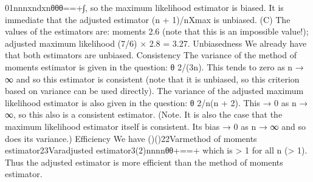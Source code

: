 \documentclass{article}
\begin{document}
\begin{enumerate}[(i)]
01nnnxndxnθθθ==+∫, so the maximum likelihood estimator is biased.
It is immediate that the adjusted estimator {(n + 1)/n}Xmax is unbiased.
(C) The values of the estimators are: moments 2.6 (note that this is an impossible value!); adjusted maximum likelihood (7/6) × 2.8 = 3.27.
Unbiasedness
We already have that both estimators are unbiased.
Consistency
The variance of the method of moments estimator is given in the question: θ 2/(3n). This tends to zero as n → ∞ and so this estimator is consistent (note that it is unbiased, so this criterion based on variance can be used directly).
The variance of the adjusted maximum likelihood estimator is also given in the question: θ 2/{n(n + 2)}. This → 0 as n → ∞, so this also is a consistent estimator. (Note. It is also the case that the maximum likelihood estimator itself is consistent. Its bias → 0 as n → ∞ and so does its variance.)
Efficiency
We have ()()22Varmethod of moments estimator23Varadjusted estimator3(2)nnnnθθ+==+
  which is > 1 for all n (> 1). Thus the adjusted estimator is more efficient than the method of moments estimator.
\end{enumerate}
\end{document}
